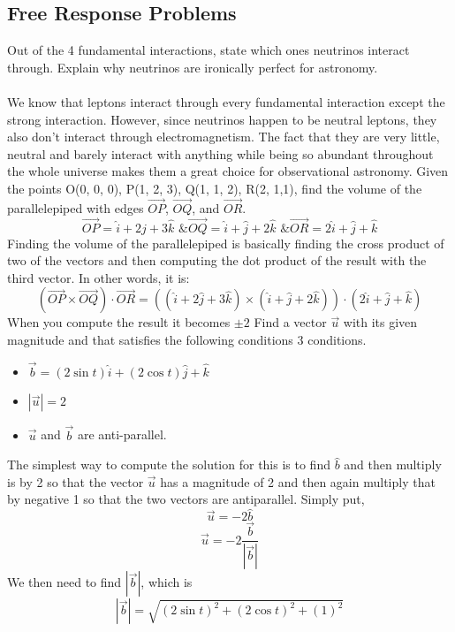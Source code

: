 \documentclass[12pt,addpoints]{exam}
\begin{document}
{{{\begin{questions}
					\subsection*{Free Response Problems}
					\question[1] Out of the 4 fundamental interactions, state which ones neutrinos interact through. Explain why neutrinos are ironically perfect for astronomy. \\ \\
					We know that leptons interact through every fundamental interaction except the strong interaction. However, since neutrinos happen to be neutral leptons, they also don't interact through electromagnetism. The fact that they are very little, neutral and barely interact with anything while being so abundant throughout the whole universe makes them a great choice for observational astronomy.
					\question[1] Given the points O(0, 0, 0), P(1, 2, 3), Q(1, 1, 2), R(2, 1,1), find the volume of the parallelepiped with edges $\overrightarrow{OP}$, $\overrightarrow{OQ}$, and $\overrightarrow{OR}$. \\ 
					$$\overrightarrow{OP}=\hat{i}+2\hat{j}+3\hat{k}\text{ \& }\overrightarrow{OQ}=\hat{i}+\hat{j}+2\hat{k}\text{ \& }\overrightarrow{OR}=2\hat{i}+\hat{j}+\hat{k}$$
					Finding the volume of the parallelepiped is basically finding the cross product of two of the vectors and then computing the dot product of the result with the third vector. In other words, it is:
					$$(\overrightarrow{OP}\times\overrightarrow{OQ})\cdot\overrightarrow{OR}=((\hat{i}+2\hat{j}+3\hat{k})\times(\hat{i}+\hat{j}+2\hat{k}))\cdot(2\hat{i}+\hat{j}+\hat{k}) $$ 
					When you compute the result it becomes $\pm2$
					\question[1] Find a vector $\vec{u}$ with its given magnitude and that satisfies the following conditions 3 conditions.
					\begin{itemize}
						\item $\vec b=(2\sin t)\hat{i}+(2\cos t)\hat{j}+\hat{k}$
						\item $|\vec u|=2$ 
						\item $\vec{u}$ and $\vec{b}$ are anti-parallel.
					\end{itemize}
					The simplest way to compute the solution for this is to find $\hat{b}$ and then multiply is by 2 so that the vector $\vec{u}$ has a magnitude of 2 and then again multiply that by negative 1 so that the two vectors are antiparallel. Simply put,
					$$\vec{u}=-2\hat{b}$$
					$$\vec{u}=-2\dfrac{\vec{b}}{|\vec{b}|}$$
					We then need to find $|\vec{b}|$, which is
					$$|\vec{b}|=\sqrt{(2\sin t)^2+(2\cos t)^2+(1)^2}$$

\end{questions}}}}
\end{document}
